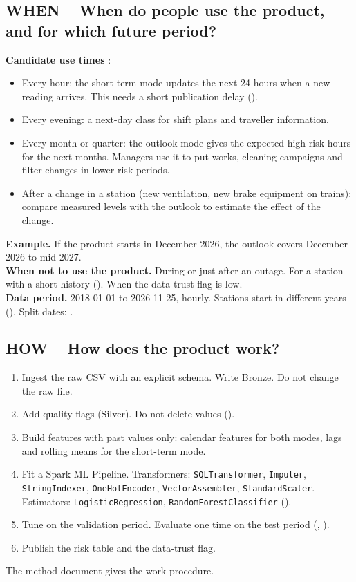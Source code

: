 \documentclass[11pt]{article}
\begin{document}
\subsection{WHEN -- When do people use the product, and for which future period?}
\textbf{Candidate use times} \tAssumed:
\begin{itemize}
  \item Every hour: the short-term mode updates the next 24 hours when a new reading arrives. This needs a short publication delay ().
  \item Every evening: a next-day class for shift plans and traveller information.
  \item Every month or quarter: the outlook mode gives the expected high-risk hours for the next months. Managers use it to put works, cleaning campaigns and filter changes in lower-risk periods.
  \item After a change in a station (new ventilation, new brake equipment on trains): compare measured levels with the outlook to estimate the effect of the change.
\end{itemize}
\textbf{Example.} If the product starts in December 2026, the outlook covers December 2026 to mid 2027.\\
\textbf{When not to use the product.} During or just after an outage. For a station with a short history (). When the data-trust flag is low.\\
\textbf{Data period.} \tObserved{} 2018-01-01 to 2026-11-25, hourly. Stations start in different years (). Split dates: .

\subsection{HOW -- How does the product work?}
\begin{enumerate}
  \item Ingest the raw CSV with an explicit schema. Write Bronze. Do not change the raw file.
  \item Add quality flags (Silver). Do not delete values ().
  \item Build features with past values only: calendar features for both modes, lags and rolling means for the short-term mode.
  \item Fit a Spark ML Pipeline. Transformers: \texttt{SQLTransformer}, \texttt{Imputer}, \texttt{StringIndexer}, \texttt{OneHotEncoder}, \texttt{VectorAssembler}, \texttt{StandardScaler}. Estimators: \texttt{LogisticRegression}, \texttt{RandomForestClassifier} ().
  \item Tune on the validation period. Evaluate one time on the test period (, ).
  \item Publish the risk table and the data-trust flag.
\end{enumerate}
The method document gives the work procedure.
\end{document}
